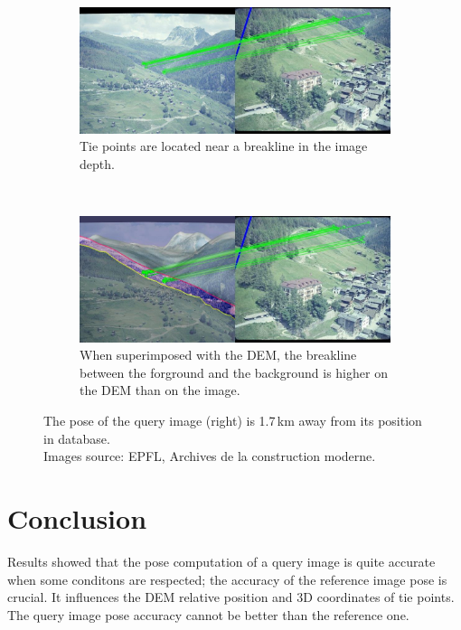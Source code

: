 \documentclass[fleqn,10pt,lineno]{wlpeerj} %
\begin{document}
\begin{figure}[H]
\centering
\begin{subfigure}{0.48\linewidth}
    \includegraphics[width=1\linewidth]{ex2.jpg}
    \caption{Tie points are located near a breakline in the image depth.}
    \label{ex2:1}
\end{subfigure}
~
\begin{subfigure}{0.48\linewidth}
    \includegraphics[width=1\linewidth]{ex2_mnt.jpg}
    \caption{When superimposed with the DEM, the breakline between the forground 
    and the background is higher on the DEM than on the image.}
    \label{ex2:2}
\end{subfigure}
\caption[]{The pose of the query image (right) is 1.7\,km away from its position in database.\\
Images source: EPFL, Archives de la construction moderne.}
\label{ex2}
\end{figure}










\section*{Conclusion}
Results showed that the pose computation of a query image is quite accurate
when some conditons are respected;  the accuracy of the reference image
pose is crucial. It influences the DEM relative position and 3D coordinates of
tie points. The query image pose accuracy cannot be better than the reference one.
\end{document}
